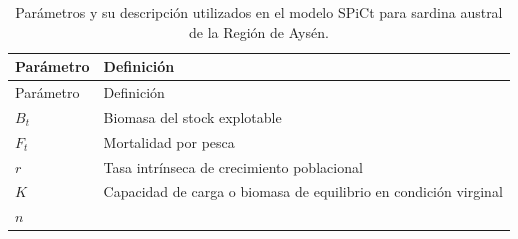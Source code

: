 \documentclass[
  spanish,
]{article}
\begin{document}
\begin{longtable}[]{@{}ll@{}}
\caption{\label{Tab5} Parámetros y su descripción utilizados en el
modelo SPiCt para sardina austral de la Región de Aysén.}\tabularnewline
\toprule
\begin{minipage}[b]{0.14\columnwidth}\raggedright
Parámetro\strut
\end{minipage} & \begin{minipage}[b]{0.80\columnwidth}\raggedright
Definición\strut
\end{minipage}\tabularnewline
\midrule
\endfirsthead
\toprule
\begin{minipage}[b]{0.14\columnwidth}\raggedright
Parámetro\strut
\end{minipage} & \begin{minipage}[b]{0.80\columnwidth}\raggedright
Definición\strut
\end{minipage}\tabularnewline
\midrule
\endhead
\begin{minipage}[t]{0.14\columnwidth}\raggedright
\(B_t\)\strut
\end{minipage} & \begin{minipage}[t]{0.80\columnwidth}\raggedright
Biomasa del stock explotable\strut
\end{minipage}\tabularnewline
\begin{minipage}[t]{0.14\columnwidth}\raggedright
\(F_t\)\strut
\end{minipage} & \begin{minipage}[t]{0.80\columnwidth}\raggedright
Mortalidad por pesca\strut
\end{minipage}\tabularnewline
\begin{minipage}[t]{0.14\columnwidth}\raggedright
\(r\)\strut
\end{minipage} & \begin{minipage}[t]{0.80\columnwidth}\raggedright
Tasa intrínseca de crecimiento poblacional\strut
\end{minipage}\tabularnewline
\begin{minipage}[t]{0.14\columnwidth}\raggedright
\(K\)\strut
\end{minipage} & \begin{minipage}[t]{0.80\columnwidth}\raggedright
Capacidad de carga o biomasa de equilibrio en condición virginal\strut
\end{minipage}\tabularnewline
\begin{minipage}[t]{0.14\columnwidth}\raggedright
\(n\)\strut
\end{minipage} & \begin{minipage}[t]{0.80\columnwidth}\raggedright

\end{minipage}
\end{longtable}
\end{document}
